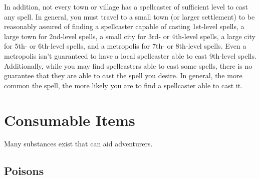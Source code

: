 \par In addition, not every town or village has a spellcaster of sufficient level to cast any spell. In general, you must travel to a small town (or larger settlement) to be reasonably assured of finding a spellcaster capable of casting 1st-level spells, a large town for 2nd-level spells, a small city for 3rd- or 4th-level spells, a large city for 5th- or 6th-level spells, and a metropolis for 7th- or 8th-level spells. Even a metropolis isn't guaranteed to have a local spellcaster able to cast 9th-level spells. Additionally, while you may find spellcasters able to cast some spells, there is no guarantee that they are able to cast the spell you desire. In general, the more common the spell, the more likely you are to find a spellcaster able to cast it.

\section{Consumable Items}\label{Consumable Items}

    Many substances exist that can aid adventurers.

    \subsection{Poisons}\label{Poisons}

